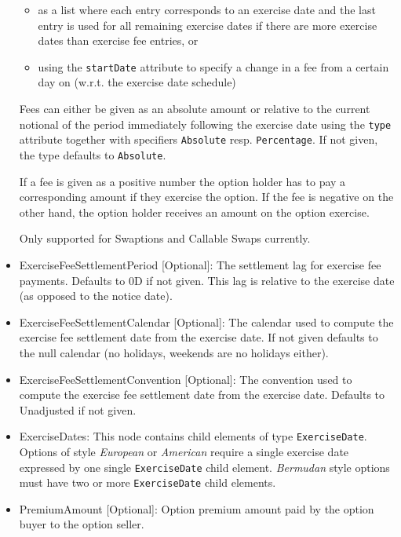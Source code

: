 \begin{itemize}
  \begin{itemize}
  \item as a list where each entry corresponds to an exercise date and the last entry is used for all remaining exercise
    dates if there are more exercise dates than exercise fee entries, or
  \item using the \verb+startDate+ attribute to specify a change in a fee from a certain day on (w.r.t. the exercise
    date schedule)
  \end{itemize}

  Fees can either be given as an absolute amount or relative to the current notional of the period immediately following
  the exercise date using the \verb+type+ attribute together with specifiers \verb+Absolute+ resp. \verb+Percentage+. If
  not given, the type defaults to \verb+Absolute+.

  If a fee is given as a positive number the option holder has to pay a corresponding amount if they exercise the
  option. If the fee is negative on the other hand, the option holder receives an amount on the option exercise.

  Only supported for Swaptions and Callable Swaps currently.

\item ExerciseFeeSettlementPeriod [Optional]: The settlement lag for exercise fee payments. Defaults to 0D if not
  given. This lag is relative to the exercise date (as opposed to the notice date).

\item ExerciseFeeSettlementCalendar [Optional]: The calendar used to compute the exercise fee settlement date from the
  exercise date. If not given defaults to the null calendar (no holidays, weekends are no holidays either).

\item ExerciseFeeSettlementConvention [Optional]: The convention used to compute the exercise fee settlement date from
  the exercise date. Defaults to Unadjusted if not given.

\item ExerciseDates: This node contains child elements of type
  \lstinline!ExerciseDate!.  Options of style \emph{European} or
  \emph{American} require a single exercise date expressed by one
  single \lstinline!ExerciseDate! child element.  \emph{Bermudan}
  style options must have two or more \lstinline!ExerciseDate! child
  elements.

\item PremiumAmount [Optional]: Option premium amount paid by the option buyer to the option seller.


\end{itemize}
